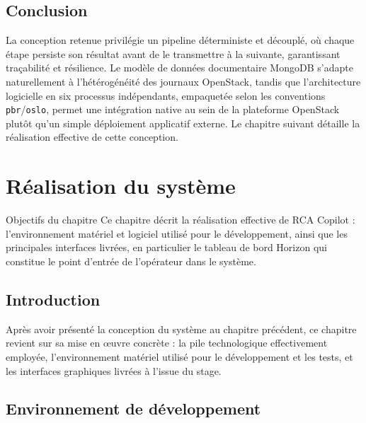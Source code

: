 \documentclass[a4paper,11pt,oneside]{report}
\newcommand{\chapterobjectives}[1]{%
\begin{block}{Objectifs du chapitre}
#1
\end{block}
}
\begin{document}
\section{Conclusion}
La conception retenue privilégie un pipeline déterministe et découplé, où chaque étape persiste son résultat avant de le transmettre à la suivante, garantissant traçabilité et résilience. Le modèle de données documentaire MongoDB s'adapte naturellement à l'hétérogénéité des journaux OpenStack, tandis que l'architecture logicielle en six processus indépendants, empaquetée selon les conventions \texttt{pbr}/\texttt{oslo}, permet une intégration native au sein de la plateforme OpenStack plutôt qu'un simple déploiement applicatif externe. Le chapitre suivant détaille la réalisation effective de cette conception.

\chapter{Réalisation du système}
\chapterobjectives{%
Ce chapitre décrit la réalisation effective de RCA Copilot : l'environnement matériel et logiciel utilisé pour le développement, ainsi que les principales interfaces livrées, en particulier le tableau de bord Horizon qui constitue le point d'entrée de l'opérateur dans le système.
}

\section{Introduction}
Après avoir présenté la conception du système au chapitre précédent, ce chapitre revient sur sa mise en œuvre concrète : la pile technologique effectivement employée, l'environnement matériel utilisé pour le développement et les tests, et les interfaces graphiques livrées à l'issue du stage.

\section{Environnement de développement}
\end{document}
